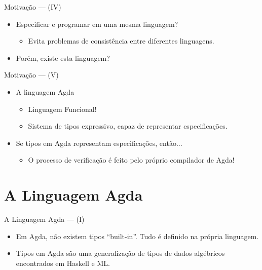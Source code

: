 \documentclass{beamer}
\begin{document}
       \begin{frame}{Motiva\c{c}\~ao --- (IV)}
         \begin{itemize}
           \item Especificar e programar em uma mesma linguagem?
           \begin{itemize}
             \item Evita problemas de consist\^encia entre diferentes linguagens. 
           \end{itemize}
           \item Por\'em, existe esta linguagem? 
         \end{itemize}
       \end{frame}  

       \begin{frame}{Motiva\c{c}\~ao --- (V)}
         \begin{itemize}
           \item A linguagem Agda
           \begin{itemize}
             \item Linguagem Funcional!
             \item Sistema de tipos expressivo, capaz de representar especifica\c{c}\~oes.
           \end{itemize}
           \item Se tipos em Agda representam especifica\c{c}\~oes, ent\~ao...
           \begin{itemize}
             \item O processo de verifica\c{c}\~ao \'e feito pelo pr\'oprio compilador de Agda!
           \end{itemize}
         \end{itemize}
       \end{frame}

       \section{A Linguagem Agda}

       \begin{frame}{A Linguagem Agda --- (I)}
         \begin{itemize}
           \item Em Agda, n\~ao existem tipos ``built-in''. Tudo \'e definido na pr\'opria linguagem.
           \item Tipos em Agda s\~ao uma generaliza\c{c}\~ao de tipos de dados alg\'ebricos encontrados em Haskell e ML.
         \end{itemize}
       \end{frame}
\end{document}
